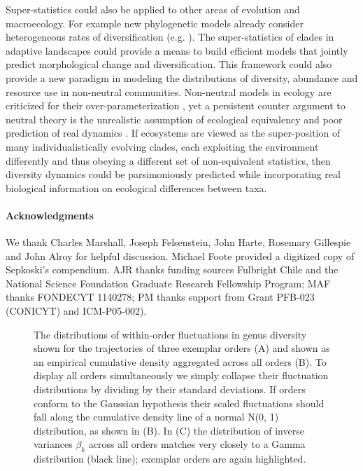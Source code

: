 Super-statistics could also be applied to other areas of evolution and
macroecology.  For example new phylogenetic models already consider
heterogeneous rates of diversification
(e.g. \cite{rabosky2006laser}). The super-statistics of clades in
adaptive landscapes could provide a means to build efficient models
that jointly predict morphological change and diversification. This
framework could also provide a new paradigm in modeling the
distributions of diversity, abundance and resource use in non-neutral
communities. Non-neutral models in ecology are criticized for their
over-parameterization \cite{rosindell2011TREE}, yet a persistent counter
argument to neutral theory \cite{hubbell2001} is the unrealistic
assumption of ecological equivalency \cite{chave2004neutral} and poor
prediction of real dynamics \cite{ricklefs2006neutral}. If ecosystems
are viewed as the super-position of many individualistically evolving
clades, each exploiting the environment differently and thus obeying a
different set of non-equivalent statistics, then diversity dynamics
could be parsimoniously predicted while incorporating real biological
information on ecological differences between taxa.


\paragraph{Acknowledgments}

  We thank Charles Marshall, Joseph Felsenstein, John Harte, Rosemary
  Gillespie and John Alroy for helpful discussion. Michael Foote
  provided a digitized copy of Sepkoski's compendium. AJR thanks
  funding sources Fulbright Chile and the National Science Foundation
  Graduate Research Fellowship Program; MAF thanks FONDECYT 1140278;
  PM thanks support from Grant PFB-023 (CONICYT) and ICM-P05-002).




\begin{figure}
  \caption{The distributions of within-order fluctuations in genus
    diversity shown for the trajectories of three exemplar orders (A)
    and shown as an empirical cumulative density aggregated across all
    orders (B). To display all orders simultaneously we simply
    collapse their fluctuation distributions by dividing by their
    standard deviations. If orders conform to the Gaussian hypothesis
    their scaled fluctuations should fall along the cumulative density
    line of a normal N(0, 1) distribution, as shown in (B). In (C) the
    distribution of inverse variances $\beta_k$ across all orders
    matches very closely to a Gamma distribution (black line);
    exemplar orders are again highlighted.}
  \label{fig:pk_f}
\end{figure}

